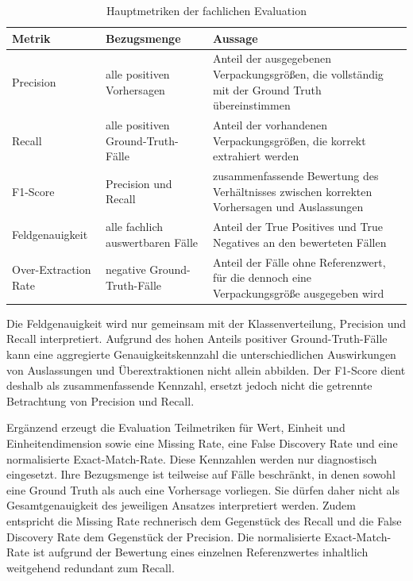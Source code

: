 \begin{table}[htbp]
    \centering
    \small
    \begin{tabular}{p{} p{} p{}}
        \hline
        \textbf{Metrik} & \textbf{Bezugsmenge} & \textbf{Aussage} \\
        \hline
        Precision &
        alle positiven Vorhersagen &
        Anteil der ausgegebenen Verpackungsgrößen, die vollständig mit der Ground Truth übereinstimmen \\
        Recall &
        alle positiven Ground-Truth-Fälle &
        Anteil der vorhandenen Verpackungsgrößen, die korrekt extrahiert werden \\
        F1-Score &
        Precision und Recall &
        zusammenfassende Bewertung des Verhältnisses zwischen korrekten Vorhersagen und Auslassungen \\
        Feldgenauigkeit &
        alle fachlich auswertbaren Fälle &
        Anteil der True Positives und True Negatives an den bewerteten Fällen \\
        Over-Extraction Rate &
        negative Ground-Truth-Fälle &
        Anteil der Fälle ohne Referenzwert, für die dennoch eine Verpackungsgröße ausgegeben wird \\
        \hline
    \end{tabular}
    \caption{Hauptmetriken der fachlichen Evaluation}
    \label{tab:evaluationsmetriken}
\end{table}

Die Feldgenauigkeit wird nur gemeinsam mit der Klassenverteilung, Precision und Recall interpretiert. Aufgrund des hohen Anteils positiver Ground-Truth-Fälle kann eine aggregierte Genauigkeitskennzahl die unterschiedlichen Auswirkungen von Auslassungen und Überextraktionen nicht allein abbilden. Der F1-Score dient deshalb als zusammenfassende Kennzahl, ersetzt jedoch nicht die getrennte Betrachtung von Precision und Recall.

Ergänzend erzeugt die Evaluation Teilmetriken für Wert, Einheit und Einheitendimension sowie eine Missing Rate, eine False Discovery Rate und eine normalisierte Exact-Match-Rate. Diese Kennzahlen werden nur diagnostisch eingesetzt. Ihre Bezugsmenge ist teilweise auf Fälle beschränkt, in denen sowohl eine Ground Truth als auch eine Vorhersage vorliegen. Sie dürfen daher nicht als Gesamtgenauigkeit des jeweiligen Ansatzes interpretiert werden. Zudem entspricht die Missing Rate rechnerisch dem Gegenstück des Recall und die False Discovery Rate dem Gegenstück der Precision. Die normalisierte Exact-Match-Rate ist aufgrund der Bewertung eines einzelnen Referenzwertes inhaltlich weitgehend redundant zum Recall.

